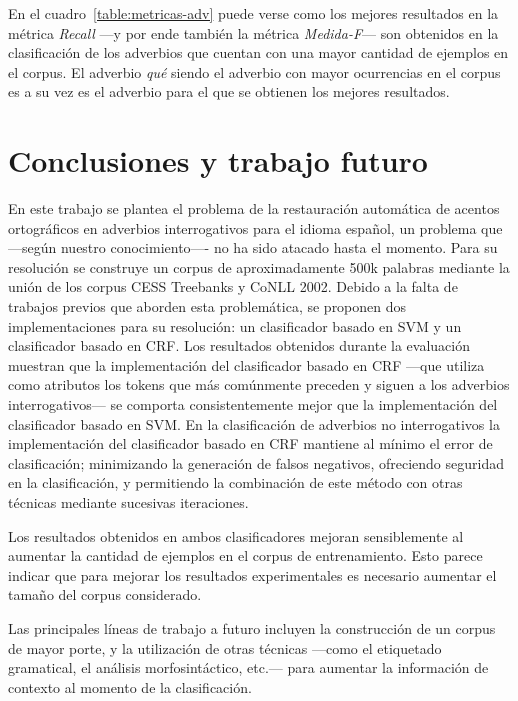 \documentclass[runningheads,a4paper]{llncs}
\begin{document}
En el cuadro~\ref{table:metricas-adv} puede verse como los mejores resultados en la métrica \emph{Recall} ---y por ende también la métrica \emph{Medida-F}--- son obtenidos en la clasificación de los adverbios que cuentan con una mayor cantidad de ejemplos en el corpus. El adverbio \emph{qué} siendo el adverbio con mayor ocurrencias en el corpus es a su vez es el adverbio para el que se obtienen los mejores resultados. 

\section{Conclusiones y trabajo futuro}
\label{sec:Conclusiones}

En este trabajo se plantea el problema de la restauración automática de acentos ortográficos en adverbios interrogativos para el idioma español, un problema que ---según nuestro conocimiento---- no ha sido atacado hasta el momento. Para su resolución se construye un corpus de aproximadamente 500k palabras mediante la unión de los corpus CESS Treebanks y CoNLL 2002. Debido a la falta de trabajos previos que aborden esta problemática, se proponen dos implementaciones para su resolución: un clasificador basado en SVM y un clasificador basado en CRF. Los resultados obtenidos durante la evaluaci\'on muestran que la implementación del clasificador basado en CRF ---que utiliza como atributos los tokens que más comúnmente preceden y siguen a los adverbios interrogativos--- se comporta consistentemente mejor que la implementación del clasificador basado en SVM. 
\newpage
En la clasificaci\'on de adverbios no interrogativos la implementación del clasificador basado en CRF mantiene al m\'inimo el error de clasificaci\'on; minimizando la generaci\'on de falsos negativos, ofreciendo seguridad en la clasificaci\'on, y permitiendo la combinaci\'on de este método con otras t\'ecnicas mediante sucesivas iteraciones. 

Los resultados obtenidos en ambos clasificadores mejoran sensiblemente  al aumentar la cantidad de ejemplos en el corpus de entrenamiento. Esto parece indicar que para mejorar los resultados experimentales es necesario aumentar el tamaño del corpus considerado.

Las principales líneas de trabajo a futuro incluyen la construcción de un corpus de mayor porte, y la utilización de otras técnicas ---como el etiquetado gramatical, el análisis morfosintáctico, etc.--- para aumentar la información de contexto al momento de la clasificación.



\end{document}
